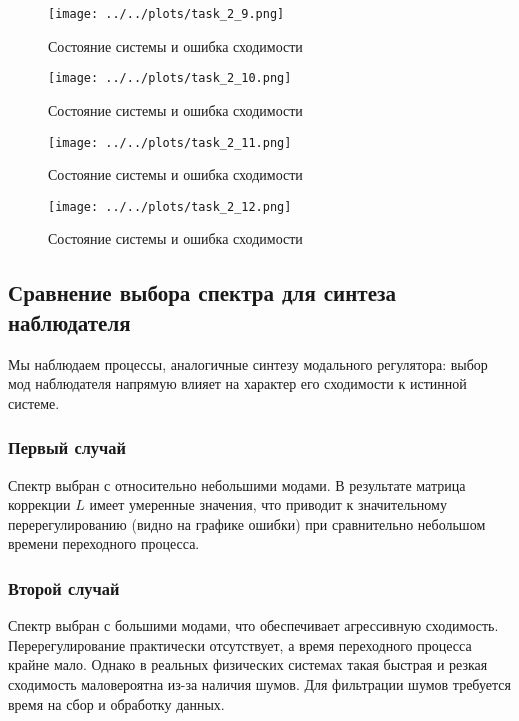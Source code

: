 \begin{figure}[H]
    \centering
    \texttt{[image: ../../plots/task\_2\_9.png]}
    \caption{Состояние системы и ошибка сходимости}
    \label{fig:task_2_state_error_system_3_1}
\end{figure}

\begin{figure}[H]
    \centering
    \texttt{[image: ../../plots/task\_2\_10.png]}
    \caption{Состояние системы и ошибка сходимости}
    \label{fig:task_2_state_error_system_3_2}
\end{figure}

\begin{figure}[H]
    \centering
    \texttt{[image: ../../plots/task\_2\_11.png]}
    \caption{Состояние системы и ошибка сходимости}
    \label{fig:task_2_state_error_system_3_3}
\end{figure}

\begin{figure}[H]
    \centering
    \texttt{[image: ../../plots/task\_2\_12.png]}
    \caption{Состояние системы и ошибка сходимости}
    \label{fig:task_2_state_error_system_3_4}
\end{figure}

\subsection{Сравнение выбора спектра для синтеза наблюдателя}

Мы наблюдаем процессы, аналогичные синтезу модального регулятора: выбор мод наблюдателя напрямую влияет на характер его сходимости к истинной системе.

\subsubsection{Первый случай}
Спектр выбран с относительно небольшими модами. В результате матрица коррекции $L$ имеет умеренные значения, что приводит к значительному перерегулированию (видно на графике ошибки) при сравнительно небольшом времени переходного процесса.

\subsubsection{Второй случай}
Спектр выбран с большими модами, что обеспечивает агрессивную сходимость. Перерегулирование практически отсутствует, а время переходного процесса крайне мало. Однако в реальных физических системах такая быстрая и резкая сходимость маловероятна из-за наличия шумов. Для фильтрации шумов требуется время на сбор и обработку данных.

